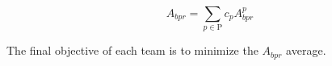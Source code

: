 $$ A_{bpr} = \sum_{p \in \text{P}} c_p A^p_{bpr} $$



The final objective of each team is to minimize the $A_{bpr}$ average.